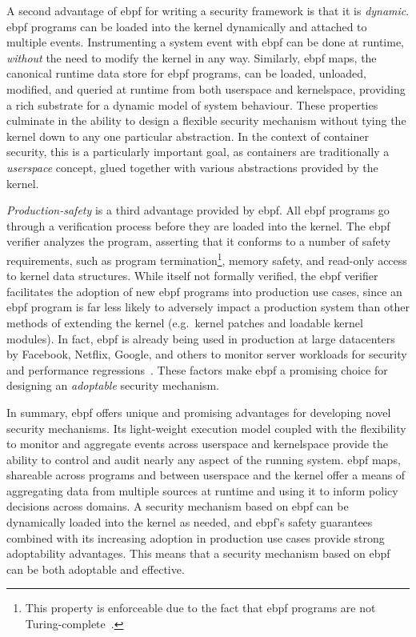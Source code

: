 A second advantage of \gls{ebpf} for writing a security framework is that it is
\textit{dynamic}. \gls{ebpf} programs can be loaded into the kernel dynamically and attached to
multiple events. Instrumenting a system event with \gls{ebpf} can be done at runtime,
\textit{without} the need to modify the kernel in any way.  Similarly, \gls{ebpf} maps, the
canonical runtime data store for \gls{ebpf} programs, can be loaded, unloaded, modified, and
queried at runtime from both userspace and kernelspace, providing a rich substrate for
a dynamic model of system behaviour. These properties culminate in the ability to design
a flexible security mechanism without tying the kernel down to any one particular
abstraction. In the context of container security, this is a particularly important goal,
as containers are traditionally a \textit{userspace} concept, glued together with various
abstractions provided by the kernel.

\textit{Production-safety} is a third advantage provided by \gls{ebpf}. All \gls{ebpf} programs go
through a verification process before they are loaded into the kernel. The \gls{ebpf} verifier
analyzes the program, asserting that it conforms to a number of safety requirements, such
as program termination\footnote{This property is enforceable due to the fact that \gls{ebpf}
programs are not Turing-complete~\cite{gregg2019_bpf}.}, memory safety, and read-only
access to kernel data structures. While itself not formally verified, the \gls{ebpf} verifier
facilitates the adoption of new \gls{ebpf} programs into production use cases, since an \gls{ebpf}
program is far less likely to adversely impact a production system than other methods of
extending the kernel (e.g.~kernel patches and loadable kernel modules). In fact, \gls{ebpf} is
already being used in production at large datacenters by Facebook, Netflix, Google, and
others to monitor server workloads for security and performance
regressions~\cite{gregg2019_bpf}. These factors make \gls{ebpf} a promising choice for
designing an \textit{adoptable} security mechanism.

In summary, \gls{ebpf} offers unique and promising advantages for developing novel security
mechanisms. Its light-weight execution model coupled with the flexibility to monitor and
aggregate events across userspace and kernelspace provide the ability to control and audit
nearly any aspect of the running system. \gls{ebpf} maps, shareable across programs and between
userspace and the kernel offer a means of aggregating data from multiple sources at
runtime and using it to inform policy decisions across domains. A security mechanism based
on \gls{ebpf} can be dynamically loaded into the kernel as needed, and \gls{ebpf}'s safety guarantees
combined with its increasing adoption in production use cases provide strong adoptability
advantages. This means that a security mechanism based on \gls{ebpf} can be both adoptable and
effective.


